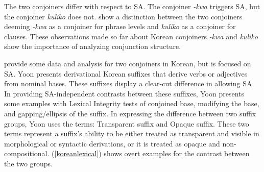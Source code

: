 The two conjoiners differ with respect to SA. The conjoiner \textit{-kwa} triggers {\Case} SA, but the conjoiner \textit{kuliko} does not. \citet{yoon2005conjunction} show a distinction between the two conjoiners deeming \textit{-kwa} as a conjoiner for phrase levels and \textit{kuliko} as a conjoiner for clauses. These observations made so far about Korean conjoiners \textit{-kwa} and \textit{kuliko} show the importance of analyzing conjunction structure.

\citet{yoon2005conjunction} provide some data and analysis for two conjoiners in Korean, but \citet{yoon2017lexical} is focused on SA. Yoon presents derivational Korean suffixes that derive verbs or adjectives from nominal bases. These suffixes display a clear-cut difference in allowing SA. In providing SA-independent contrasts between these suffixes, Yoon presents some examples with Lexical Integrity tests of conjoined base, modifying the base, and gapping/ellipsis of the suffix. In expressing the difference between two suffix groups, Yoon uses the terms: Transparent suffix and Opaque suffix. These two terms represent a suffix's ability to be either treated as transparent and visible in morphological or syntactic derivations, or it is treated as opaque and non-compositional. (\ref{koreanlexical}) shows overt examples for the contrast between the two groups.


